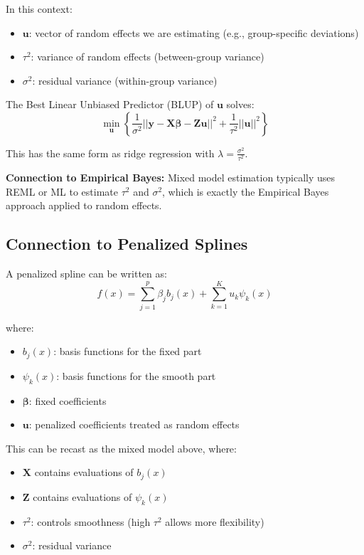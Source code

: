 \documentclass[12pt]{article}
\begin{document}
In this context:
\begin{itemize}
    \item $\mathbf{u}$: vector of random effects we are estimating (e.g., group-specific deviations)
    \item $\tau^2$: variance of random effects (between-group variance)
    \item $\sigma^2$: residual variance (within-group variance)
\end{itemize}

The Best Linear Unbiased Predictor (BLUP) of $\mathbf{u}$ solves:
\begin{equation}
\min_{\mathbf{u}} \left\{\frac{1}{\sigma^2}||\mathbf{y} - \mathbf{X}\boldsymbol{\beta} - \mathbf{Z}\mathbf{u}||^2 + \frac{1}{\tau^2}||\mathbf{u}||^2\right\}
\end{equation}

This has the same form as ridge regression with $\lambda = \frac{\sigma^2}{\tau^2}$.

\textbf{Connection to Empirical Bayes:} Mixed model estimation typically uses REML or ML to estimate $\tau^2$ and $\sigma^2$, which is exactly the Empirical Bayes approach applied to random effects.

\subsection{Connection to Penalized Splines}

A penalized spline can be written as:
\begin{equation}
f(x) = \sum_{j=1}^p \beta_j b_j(x) + \sum_{k=1}^K u_k \psi_k(x)
\end{equation}

where:
\begin{itemize}
    \item $b_j(x)$: basis functions for the fixed part
    \item $\psi_k(x)$: basis functions for the smooth part
    \item $\boldsymbol{\beta}$: fixed coefficients
    \item $\mathbf{u}$: penalized coefficients treated as random effects
\end{itemize}

This can be recast as the mixed model above, where:
\begin{itemize}
    \item $\mathbf{X}$ contains evaluations of $b_j(x)$
    \item $\mathbf{Z}$ contains evaluations of $\psi_k(x)$
    \item $\tau^2$: controls smoothness (high $\tau^2$ allows more flexibility)
    \item $\sigma^2$: residual variance
\end{itemize}
\end{document}
